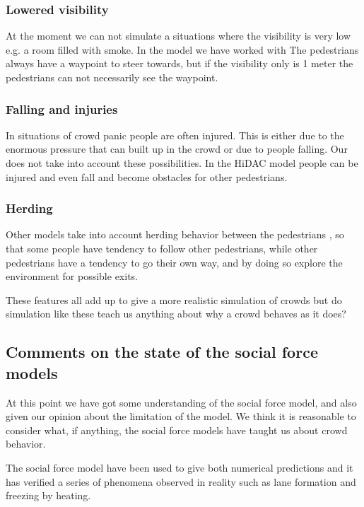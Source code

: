 \subsubsection{Lowered visibility}
At the moment we can not simulate a situations where the visibility is very low 
e.g. a room filled with smoke. In the model we have worked with The pedestrians always 
have a waypoint to steer towards, but if the visibility only is 1 meter the 
pedestrians can not necessarily see the waypoint. %

\subsubsection{Falling and injuries}
In situations of crowd panic people are often injured. This is either due to the 
enormous pressure that can built up in the crowd or due to people falling. Our 
does not take into account these possibilities. In the HiDAC model people can 
be injured and even fall and become obstacles for other pedestrians.\cite{HiDAC}

\subsubsection{Herding}
Other models take into account herding behavior between the pedestrians  
\cite{helbing00}, so that some people have tendency to follow other pedestrians, 
while other pedestrians have a tendency to go their own way,  and by doing so 
explore the environment for possible exits.

These features all add up to give a more realistic simulation of crowds 
but do simulation like these teach us anything about why a crowd behaves 
as it does?

\subsection{Comments on the state of the social force models}
At this point we have got some understanding of the social force model, and 
also given our opinion about the limitation of the model. We think it is 
reasonable to consider what, if anything, the social force models have taught 
us about crowd behavior. 

The social force model have been used to give both numerical predictions 
and it has verified a series of phenomena observed in reality such as 
lane formation and freezing by heating.

